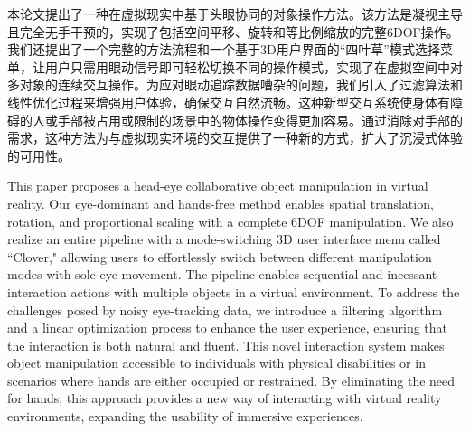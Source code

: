 
\begin{cabstract}
本论文提出了一种在虚拟现实中基于头眼协同的对象操作方法。该方法是凝视主导且完全无手干预的，实现了包括空间平移、旋转和等比例缩放的完整6DOF操作。我们还提出了一个完整的方法流程和一个基于3D用户界面的“四叶草”模式选择菜单，让用户只需用眼动信号即可轻松切换不同的操作模式，实现了在虚拟空间中对多对象的连续交互操作。为应对眼动追踪数据嘈杂的问题，我们引入了过滤算法和线性优化过程来增强用户体验，确保交互自然流畅。这种新型交互系统使身体有障碍的人或手部被占用或限制的场景中的物体操作变得更加容易。通过消除对手部的需求，这种方法为与虚拟现实环境的交互提供了一种新的方式，扩大了沉浸式体验的可用性。
\end{cabstract}

\begin{eabstract}
This paper proposes a head-eye collaborative object manipulation in virtual reality. Our eye-dominant and hands-free method enables spatial translation, rotation, and proportional scaling with a complete 6DOF manipulation. We also realize an entire pipeline with a mode-switching 3D user interface menu called ``Clover," allowing users to effortlessly switch between different manipulation modes with sole eye movement. The pipeline enables sequential and incessant interaction actions with multiple objects in a virtual environment. To address the challenges posed by noisy eye-tracking data, we introduce a filtering algorithm and a linear optimization process to enhance the user experience, ensuring that the interaction is both natural and fluent. This novel interaction system makes object manipulation accessible to individuals with physical disabilities or in scenarios where hands are either occupied or restrained. By eliminating the need for hands, this approach provides a new way of interacting with virtual reality environments, expanding the usability of immersive experiences.
\end{eabstract}
